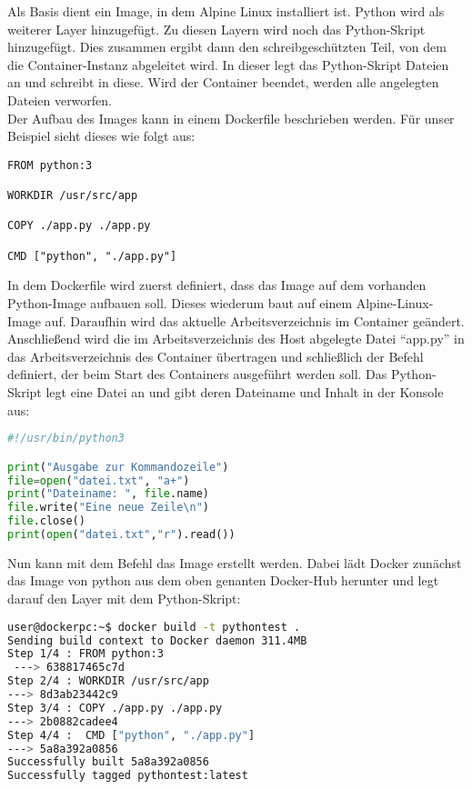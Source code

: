 Als Basis dient ein Image, in dem Alpine Linux installiert ist. Python wird als weiterer Layer hinzugefügt. Zu diesen Layern wird noch das Python-Skript hinzugefügt. Dies zusammen ergibt dann den schreibgeschützten Teil, von dem die Container-Instanz abgeleitet wird. In dieser legt das Python-Skript Dateien an und schreibt in diese. Wird der Container beendet, werden alle angelegten Dateien verworfen.\\
Der Aufbau des Images kann in einem Dockerfile beschrieben werden. Für unser Beispiel sieht dieses wie folgt aus:

\begin{lstlisting}[language=docker,caption={Dockerfile},label={code:dockerfile}]
FROM python:3 

WORKDIR /usr/src/app

COPY ./app.py ./app.py

CMD ["python", "./app.py"]
\end{lstlisting}

In dem Dockerfile wird zuerst definiert, dass das Image auf dem vorhanden Python-Image aufbauen soll. Dieses wiederum baut auf einem Alpine-Linux-Image auf. Daraufhin wird das aktuelle Arbeitsverzeichnis im Container geändert. Anschließend wird die im Arbeitsverzeichnis des Host abgelegte Datei "`app.py"' in das Arbeitsverzeichnis des Container übertragen und schließlich der Befehl definiert, der beim Start des Containers ausgeführt werden soll. Das Python-Skript legt eine Datei an und gibt deren Dateiname und Inhalt in der Konsole aus:
\begin{lstlisting}[language=python,caption={app.py},label={code:pythonapp}]
#!/usr/bin/python3

print("Ausgabe zur Kommandozeile")
file=open("datei.txt", "a+")
print("Dateiname: ", file.name)
file.write("Eine neue Zeile\n")
file.close()
print(open("datei.txt","r").read())
\end{lstlisting}
Nun kann mit dem Befehl  das Image erstellt werden. Dabei lädt Docker zunächst das Image von python aus dem oben genanten Docker-Hub herunter und legt darauf den Layer mit dem Python-Skript:

\begin{lstlisting}[language=bash,caption={Terminalausgabe docker build},label={code:dockerbuild}]
user@dockerpc:~$ docker build -t pythontest .
Sending build context to Docker daemon 311.4MB
Step 1/4 : FROM python:3
 ---> 638817465c7d
Step 2/4 : WORKDIR /usr/src/app
---> 8d3ab23442c9
Step 3/4 : COPY ./app.py ./app.py
---> 2b0882cadee4
Step 4/4 :  CMD ["python", "./app.py"]
---> 5a8a392a0856
Successfully built 5a8a392a0856
Successfully tagged pythontest:latest
\end{lstlisting}

